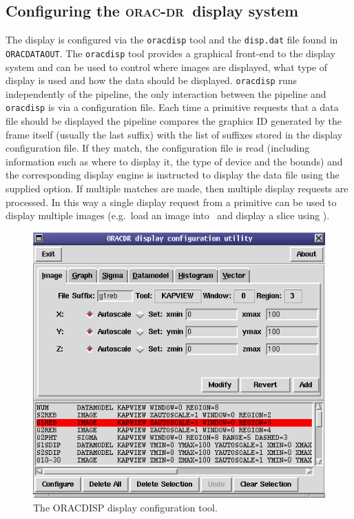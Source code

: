 \documentclass[twoside,11pt]{article}
\newcommand{\xref}[3]{#1}
\newcommand{\xlabel}[1]{}
\renewcommand{\_}{\texttt{\symbol{95}}}
\newcommand{\oracdr}{\xref{\textsc{orac-dr}}{sun230}{}}
\newcommand{\Kappa}{\xref{{\sc{Kappa}}}{sun95}{}}
\newcommand{\gaia}{\xref{{\sc{Gaia}}}{sun214}{}}
\begin{document}
\subsection{Configuring the \oracdr\ display system\xlabel{configuring_the_oracdr_display_system}}

The display is configured via the \texttt{oracdisp} tool and the
\texttt{disp.dat} file found in \texttt{ORAC\_DATA\_OUT}. The \texttt{oracdisp}
tool provides a graphical front-end to the display system and
can be used to control where images are displayed, what type of display
is used and how the data should be displayed. \texttt{oracdisp}
runs independently of the pipeline, the only interaction between
the pipeline and \texttt{oracdisp} is via a configuration file.
Each time a primitive requests that a data file should be displayed
the pipeline compares the graphics ID generated by the frame itself (usually
the last suffix) with the list of suffixes stored in the display configuration
file. If they match, the configuration file is read (including information
such as where to display it, the type of device and the bounds) and the
corresponding display engine is instructed to display the data file
using the supplied option. If multiple matches are made, then multiple
display requests are processed. In this way a single display request
from a primitive can be used to display multiple images (e.g.\ load an image
into \gaia\ and display a slice using \Kappa).


\begin{figure}
\begin{center}
\includegraphics[width=\textwidth]{sun231_disp}
\caption{The ORACDISP display configuration tool.}
\label{fig:oracdisp}
\end{center}
\end{figure}
\end{document}
